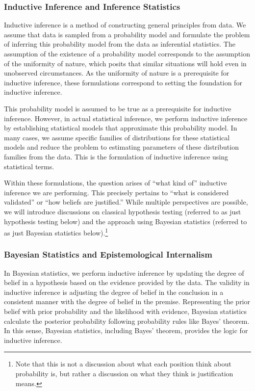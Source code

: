 \subsubsection{Inductive Inference and Inference Statistics}

Inductive inference is a method of constructing general principles from data. We assume that data is sampled from a probability model and formulate the problem of inferring this probability model from the data as inferential statistics. The assumption of the existence of a probability model corresponds to the assumption of the uniformity of nature, which posits that similar situations will hold even in unobserved circumstances. As the uniformity of nature is a prerequisite for inductive inference, these formulations correspond to setting the foundation for inductive inference.

This probability model is assumed to be true as a prerequisite for inductive inference. However, in actual statistical inference, we perform inductive inference by establishing statistical models that approximate this probability model. In many cases, we assume specific families of distributions for these statistical models and reduce the problem to estimating parameters of these distribution families from the data. This is the formulation of inductive inference using statistical terms.

Within these formulations, the question arises of ``what kind of'' inductive inference we are performing. This precisely pertains to ``what is considered validated'' or ``how beliefs are justified.'' While multiple perspectives are possible, we will introduce discussions on classical hypothesis testing (referred to as just hypothesis testing below) and the approach using Bayesian statistics (referred to as just Bayesian statistics below).\footnote{
Note that this is not a discussion about what each position think about probability is, but rather a discussion on what they think is justification means.
}

\subsubsection{Bayesian Statistics and Epistemological Internalism}
In Bayesian statistics, we perform inductive inference by updating the degree of belief in a hypothesis based on the evidence provided by the data. The validity in inductive inference is adjusting the degree of belief in the conclusion in a consistent manner with the degree of belief in the premise. Representing the prior belief with prior probability and the likelihood with evidence, Bayesian statistics calculate the posterior probability following probability rules like Bayes' theorem. In this sense, Bayesian statistics, including Bayes' theorem, provides the logic for inductive inference. 

